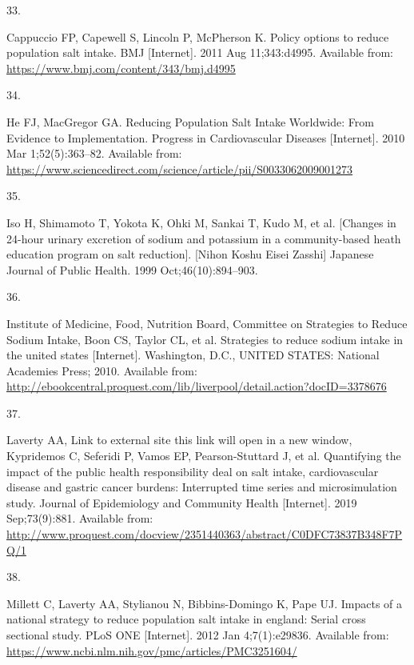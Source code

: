 \documentclass[
]{article}
\newlength{\cslhangindent}
\newlength{\csllabelwidth}
\newlength{\cslentryspacingunit} %
\newenvironment{CSLReferences}[2] %
 {%
  \setlength{\parindent}{0pt}
  \ifodd #1
  \let\oldpar\par
  \def\par{\hangindent=\cslhangindent\oldpar}
  \fi
  \setlength{\parskip}{#2\cslentryspacingunit}
 }%
 {}
\newcommand{\CSLLeftMargin}[1]{\parbox[t]{\csllabelwidth}{#1}}
\newcommand{\CSLRightInline}[1]{\parbox[t]{\linewidth - \csllabelwidth}{#1}\break}
\begin{document}
\begin{CSLReferences}{0}{0}
\leavevmode{}%
\CSLLeftMargin{33. }%
\CSLRightInline{Cappuccio FP, Capewell S, Lincoln P, McPherson K. Policy
options to reduce population salt intake. BMJ {[}Internet{]}. 2011 Aug
11;343:d4995. Available from:
\url{https://www.bmj.com/content/343/bmj.d4995}}

\leavevmode{}%
\CSLLeftMargin{34. }%
\CSLRightInline{He FJ, MacGregor GA. Reducing Population Salt Intake
Worldwide: From Evidence to Implementation. Progress in Cardiovascular
Diseases {[}Internet{]}. 2010 Mar 1;52(5):363--82. Available from:
\url{https://www.sciencedirect.com/science/article/pii/S0033062009001273}}

\leavevmode{}%
\CSLLeftMargin{35. }%
\CSLRightInline{Iso H, Shimamoto T, Yokota K, Ohki M, Sankai T, Kudo M,
et al. {[}Changes in 24-hour urinary excretion of sodium and potassium
in a community-based heath education program on salt reduction{]}.
{[}Nihon Koshu Eisei Zasshi{]} Japanese Journal of Public Health. 1999
Oct;46(10):894--903. }

\leavevmode{}%
\CSLLeftMargin{36. }%
\CSLRightInline{Institute of Medicine, Food, Nutrition Board, Committee
on Strategies to Reduce Sodium Intake, Boon CS, Taylor CL, et al.
Strategies to reduce sodium intake in the united states {[}Internet{]}.
Washington, D.C., UNITED STATES: National Academies Press; 2010.
Available from:
\url{http://ebookcentral.proquest.com/lib/liverpool/detail.action?docID=3378676}}

\leavevmode{}%
\CSLLeftMargin{37. }%
\CSLRightInline{Laverty AA, Link to external site this link will open in
a new window, Kypridemos C, Seferidi P, Vamos EP, Pearson-Stuttard J, et
al. Quantifying the impact of the public health responsibility deal on
salt intake, cardiovascular disease and gastric cancer burdens:
Interrupted time series and microsimulation study. Journal of
Epidemiology and Community Health {[}Internet{]}. 2019 Sep;73(9):881.
Available from:
\url{http://www.proquest.com/docview/2351440363/abstract/C0DFC73837B348F7PQ/1}}

\leavevmode{}%
\CSLLeftMargin{38. }%
\CSLRightInline{Millett C, Laverty AA, Stylianou N, Bibbins-Domingo K,
Pape UJ. Impacts of a national strategy to reduce population salt intake
in england: Serial cross sectional study. PLoS ONE {[}Internet{]}. 2012
Jan 4;7(1):e29836. Available from:
\url{https://www.ncbi.nlm.nih.gov/pmc/articles/PMC3251604/}}


\end{CSLReferences}
\end{document}
